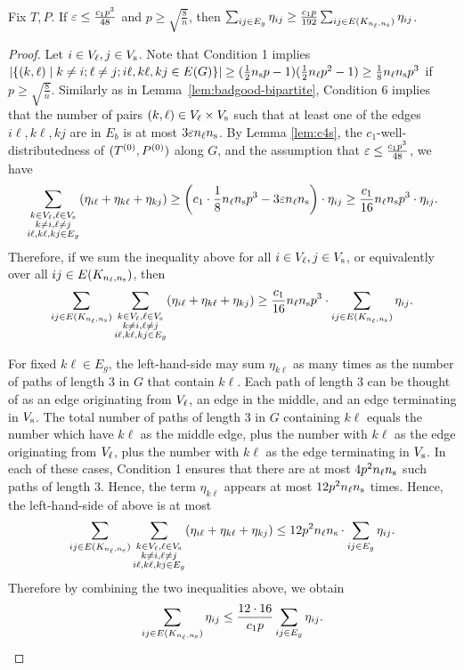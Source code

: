 \begin{lemma} \label{lem:transference-bipartite} 
Fix $T, P$. If $\varepsilon \leq \frac{c_1 p^3}{48}$ and $p \geq \sqrt{\frac{8}{n}}$, then $\sum_{ij\in E_{g}}\eta_{ij}\ge\frac{c_{1}p}{192}\sum_{ij\in E(K_{n_\ell, n_\text{s}})}\eta_{ij}$.
\end{lemma}
\begin{proof}
Let $i \in V_\ell, j \in V_\text{s}$.  Note that Condition 1 implies $|\{(k,\ell) \mid k\neq i; \ell \neq j; i\ell,k\ell,kj\in E(G) \}|\geq (\frac{1}{2} n_\text{s} p -1) (\frac{1}{2} n_\ell p^2 - 1) \geq \frac{1}{8} n_\ell n_\text{s} p^3$ if $p \geq \sqrt{\frac{8}{n}}$.  Similarly as in Lemma~\ref{lem:badgood-bipartite}, Condition 6 implies that
the number of pairs $(k,\ell) \in V_\ell \times V_\text{s}$ such that at least one of the edges $i\ell, k\ell, kj$ are in $E_b$ is at most $3\varepsilon n_\ell n_\text{s}$.
By Lemma \ref{lem:c4s}, the $c_1$-well-distributedness of $(T^{(0)},P^{(0)})$ along $G$, and the assumption that $\varepsilon \leq  \frac{c_1 p^3}{48}$, we have 
\[
	\sum_{\substack{k \in V_\ell, \ell \in V_\text{s}\\k\neq i,\ell \neq j\\i\ell, k\ell, kj\in E_{g}}}(\eta_{i\ell}+\eta_{k\ell} + \eta_{kj})
	\ge\left(c_{1}\cdot\frac{1}{8}n_\ell n_\text{s} p^3- 3 \varepsilon n_\ell n_\text{s}\right)\cdot\eta_{ij}
	\ge\frac{c_{1}}{16}n_\ell n_\text{s} p^3\cdot\eta_{ij}.
\]
Therefore, if we sum the inequality above for all $i\in V_\ell, j \in V_\text{s}$, or equivalently over all $ij \in E(K_{n_\ell, n_\text{s}})$, then
\[
	\sum_{ij \in E(K_{n_\ell, n_\text{s}})}
	\sum_{\substack{k \in V_\ell, \ell \in V_\text{s}\\k\neq i,\ell \neq j\\i\ell, k\ell, kj\in E_{g}}}(\eta_{i\ell}+\eta_{k\ell} + \eta_{kj})
\ge\frac{c_{1}}{16}n_\ell n_\text{s} p^3\cdot\sum_{ij\in E(K_{n_\ell, n_\text{s}})}\eta_{ij}.
\]

For fixed $k\ell\in E_{g}$, the left-hand-side may sum $\eta_{k\ell}$
as many times as the number of paths of length $3$ in $G$ that contain $k\ell$.  Each path of length $3$ can be thought of as an edge originating from $V_\ell$, an edge in the middle, and an edge terminating in $V_\text{s}$.  The total number of paths of length $3$ in $G$ containing $k\ell$ equals the number which have $k\ell$ as the middle edge, plus the number with $k\ell$ as the edge originating from $V_\ell$, plus the number with $k\ell$ as the edge terminating in $V_\text{s}$.   In each of these cases, Condition 1 ensures that there are at most $ 4 p^2 n_\ell n_\text{s}$ such paths of length $3$.  Hence, the term $\eta_{k\ell}$ appears at most $12 p^2 n_\ell n_\text{s}$ times.
Hence, the left-hand-side of above is at most 
\[
	\sum_{ij\in E(K_{n_\ell, n_\text{s}})}
	\sum_{\substack{k \in V_\ell, \ell \in V_\text{s}\\k\neq i,\ell \neq j\\i\ell, k\ell, kj\in E_{g}}}(\eta_{i\ell}+\eta_{k\ell} + \eta_{kj})
	\le 12 p^2 n_\ell n_\text{s}\cdot\sum_{ij\in E_{g}}\eta_{ij}.
\]
Therefore by combining the two inequalities above, we obtain 
\[
	\sum_{ij\in E(\Knn)}\eta_{ij}
	\le\frac{12\cdot 16}{c_{1}p}\sum_{ij\in E_{g}}\eta_{ij}. %
	\qedhere
\]

\end{proof}

